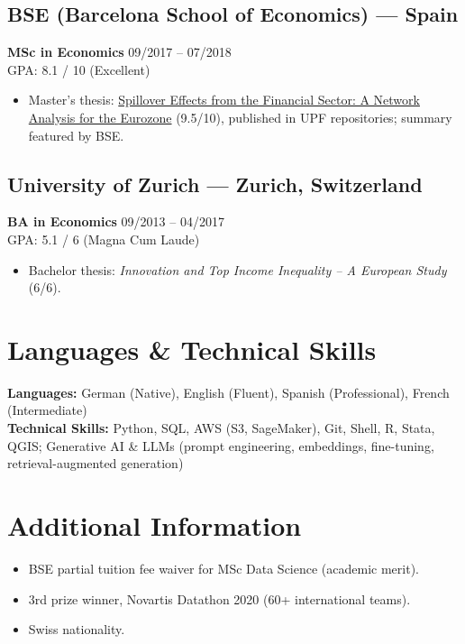 \documentclass[10.5pt,a4paper]{article}
\begin{document}
\subsection*{BSE (Barcelona School of Economics) --- Spain}
\textbf{MSc in Economics} \hfill 09/2017 -- 07/2018 \\
GPA: 8.1 / 10 (Excellent)
\begin{itemize}
    \item Master's thesis: \href{https://thevoice.bse.eu/2018/09/03/spillover-effects-financial-sector-network-analysis-eurozone/}{Spillover Effects from the Financial Sector: A Network Analysis for the Eurozone} (9.5/10), published in UPF repositories; summary featured by BSE.

\end{itemize}

\subsection*{University of Zurich --- Zurich, Switzerland}
\textbf{BA in Economics} \hfill 09/2013 -- 04/2017 \\
GPA: 5.1 / 6 (Magna Cum Laude)
\begin{itemize}
    \item Bachelor thesis: \textit{Innovation and Top Income Inequality -- A European Study} (6/6).
\end{itemize}

\section*{Languages \& Technical Skills}

\textbf{Languages:} German (Native), English (Fluent), Spanish (Professional), French (Intermediate) \\

\textbf{Technical Skills:} Python, SQL, AWS (S3, SageMaker), Git, Shell, R, Stata, QGIS;
Generative AI \& LLMs (prompt engineering, embeddings, fine-tuning, retrieval-augmented generation)


\section*{Additional Information}

\begin{itemize}
    \item BSE partial tuition fee waiver for MSc Data Science (academic merit).
    \item 3rd prize winner, Novartis Datathon 2020 (60+ international teams).
    \item Swiss nationality.
\end{itemize}
\end{document}
